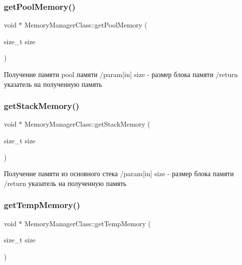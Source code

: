 \subsubsection{\texorpdfstring{get\+Pool\+Memory()}{getPoolMemory()}}
{\footnotesize\ttfamily void $\ast$ Memory\+Manager\+Class\+::get\+Pool\+Memory (\begin{DoxyParamCaption}\item[{size\+\_\+t}]{size }\end{DoxyParamCaption})}



Получение памяти pool памяти /param\mbox{[}in\mbox{]} size -\/ размер блока памяти /return указатель на полученную память 

\mbox{\label{class_memory_manager_class_abd46a6a36966f417f0e54b8fc4d6d8b1}} 
\subsubsection{\texorpdfstring{get\+Stack\+Memory()}{getStackMemory()}}
{\footnotesize\ttfamily void $\ast$ Memory\+Manager\+Class\+::get\+Stack\+Memory (\begin{DoxyParamCaption}\item[{size\+\_\+t}]{size }\end{DoxyParamCaption})}



Получение памяти из основного стека /param\mbox{[}in\mbox{]} size -\/ размер блока памяти /return указатель на полученную память 

\mbox{\label{class_memory_manager_class_a6818ba26e0f20964dbf3409396c56136}} 
\subsubsection{\texorpdfstring{get\+Temp\+Memory()}{getTempMemory()}}
{\footnotesize\ttfamily void $\ast$ Memory\+Manager\+Class\+::get\+Temp\+Memory (\begin{DoxyParamCaption}\item[{size\+\_\+t}]{size }\end{DoxyParamCaption})}



